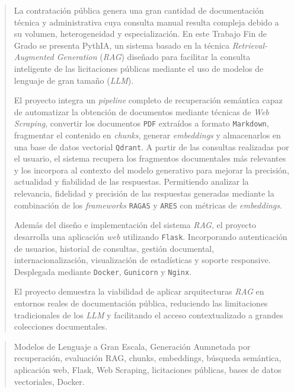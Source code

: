 \documentclass[a4paper,12pt,twoside]{memoir}
\newcommand{\file}[1]{\texttt{#1}}
\newcommand{\eng}[1]{\textit{#1}}
\begin{document}
\renewcommand*\abstractname{Resumen}
\begin{abstract}
La contratación pública genera una gran cantidad de documentación técnica y administrativa cuya consulta manual resulta compleja debido a su volumen, heterogeneidad y especialización. En este Trabajo Fin de Grado se presenta PythIA, un sistema basado en la técnica \eng{Retrieval-Augmented Generation} (\eng{RAG}) diseñado para facilitar la consulta inteligente de las licitaciones públicas mediante el uso de modelos de lenguaje de gran tamaño (\eng{LLM}).

El proyecto integra un \eng{pipeline} completo de recuperación semántica capaz de automatizar la obtención de documentos mediante técnicas de \eng{Web Scraping}, convertir los documentos \file{PDF} extraídos a formato \file{Markdown}, fragmentar el contenido en \eng{chunks}, generar \eng{embeddings} y almacenarlos en una base de datos vectorial \file{Qdrant}. A partir de las consultas realizadas por el usuario, el sistema recupera los fragmentos documentales más relevantes y los incorpora al contexto del modelo generativo para mejorar la precisión, actualidad y fiabilidad de las respuestas. Permitiendo analizar la relevancia, fidelidad y precisión de las respuestas generadas mediante la combinación de los \eng{frameworks} \file{RAGAS} y \file{ARES} con métricas de \eng{embeddings}.

Además del diseño e implementación del sistema \eng{RAG}, el proyecto desarrolla una aplicación \eng{web} utilizando \file{Flask}. Incorporando autenticación de usuarios, historial de consultas, gestión documental, internacionalización, visualización de estadísticas y soporte responsive. Desplegada mediante \file{Docker}, \file{Gunicorn} y \file{Nginx}. 

El proyecto demuestra la viabilidad de aplicar arquitecturas \eng{RAG} en entornos reales de documentación pública, reduciendo las limitaciones tradicionales de los \eng{LLM} y facilitando el acceso contextualizado a grandes colecciones documentales.
\end{abstract}

\renewcommand*\abstractname{Descriptores}
\begin{abstract}
Modelos de Lenguaje a Gran Escala, Generación Aumnetada por recuperación, evaluación RAG, chunks, embeddings, búsqueda semántica, aplicación web, Flask, Web Scraping, licitaciones públicas, bases de datos vectoriales, Docker.
\end{abstract}
\end{document}
